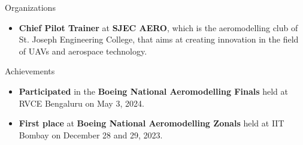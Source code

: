 \documentclass{resume} %
\begin{document}
\begin{rSection}{Organizations} 
    \begin{itemize}
        \item 	\textbf{Chief Pilot Trainer} at \textbf{SJEC AERO}, which is the aeromodelling club of St. Joseph Engineering College, that aims at creating innovation in the field of UAVs and aerospace technology.
        
        
    
    \end{itemize}
    
    
\end{rSection}


\begin{rSection}{Achievements} 
    \begin{itemize}
        \item 	\textbf{Participated} in the \textbf{Boeing National Aeromodelling Finals} held at RVCE Bengaluru on May 3, 2024.
 
        \item 	\textbf{First place} at \textbf{Boeing National Aeromodelling Zonals} held at IIT Bombay on December 28 and 29, 2023.
        
        
    
    \end{itemize}
    
    
    \end{rSection}
\end{document}
